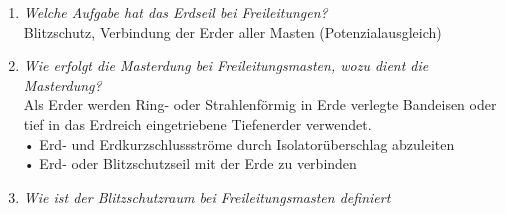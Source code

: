 \documentclass[12pt]{article}
\begin{document}
\begin{enumerate}
    \item \textit{Welche Aufgabe hat das Erdseil bei Freileitungen?}\\
    Blitzschutz, Verbindung der Erder aller Masten (Potenzialausgleich)
    \item \textit{Wie erfolgt die Masterdung bei Freileitungsmasten, 
    wozu dient die Masterdung?}\\
    Als Erder werden Ring- oder Strahlenförmig in Erde verlegte Bandeisen oder tief in das Erdreich eingetriebene 
    Tiefenerder verwendet. \\
    • Erd- und Erdkurzschlussströme durch Isolatorüberschlag abzuleiten\\
    • Erd- oder Blitzschutzseil mit der Erde zu verbinden\\
    \item \textit{Wie ist der Blitzschutzraum bei Freileitungsmasten 
    definiert}\\
    

\end{enumerate}
\end{document}
